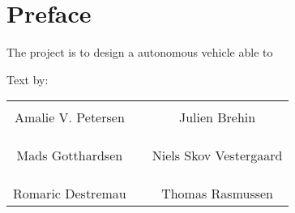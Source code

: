 \chapter*{Preface}
The project is to design a autonomous vehicle able to 

Text by:\\
%
\begin{table}[H]
	\centering
		\begin{tabular}{c c c}
			\underline{\phantom{JAERJAERJAERJAERGO}} & \phantom{cookies} & \underline{\phantom{JAERJAERJAERJAERGO}} \\
			Amalie V. Petersen			& \phantom{cookies} & Julien Brehin		\\
			&&\\
			&&\\
			\underline{\phantom{JAERJAERJAERJAERGO}} & \phantom{cookies} & \underline{\phantom{JAERJAERJAERJAERGO}} \\
			Mads Gotthardsen			& \phantom{cookies} & Niels Skov Vestergaard		\\
			&&\\
			&&\\
	    \underline{\phantom{JAERJAERJAERJAERGO}} & \phantom{cookies} & \underline{\phantom{JAERJAERJAERJAERGO}} \\
			Romaric Destremau 					& \phantom{cookies} & Thomas Rasmussen 			\\			
		\end{tabular}
\end{table}